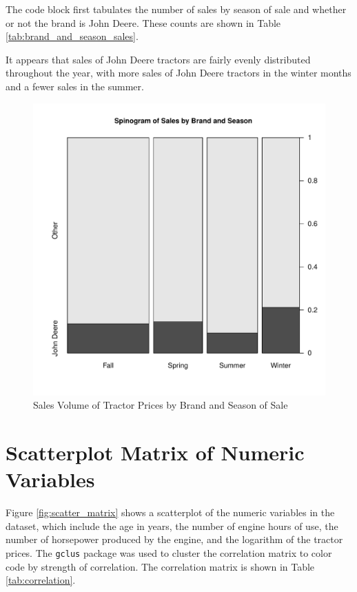 \documentclass[11pt]{book}
\begin{document}
The code block first tabulates the number of sales by 
season of sale and whether or not the brand is John Deere.
These counts are shown in Table \ref{tab:brand_and_season_sales}. 



\pagebreak
It appears that sales of John Deere tractors are fairly evenly
distributed throughout the year, 
with more sales of John Deere tractors in the winter months
and a fewer sales in the summer. 


\begin{figure}[h!]
  \centering
  \includegraphics[scale = 0.5, keepaspectratio=true]{../Figures/brand_and_season_sales}
  \caption{Sales Volume of Tractor Prices by Brand and Season of Sale} \label{fig:brand_and_season_sales}
\end{figure}




\pagebreak
\section{Scatterplot Matrix of Numeric Variables}

Figure \ref{fig:scatter_matrix}
shows a scatterplot of the numeric variables in the dataset, 
which include 
the age in years, the number of engine hours of use, 
the number of horsepower produced by the engine, 
and the logarithm of the tractor prices. 
The \texttt{gclus} package was used to cluster the
correlation matrix to color code by strength of correlation. 
The correlation matrix is shown in Table \ref{tab:correlation}.
\end{document}
